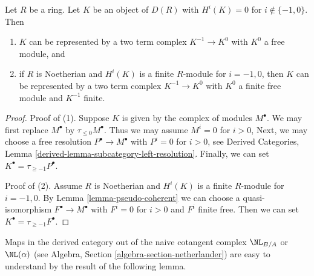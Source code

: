 \begin{lemma}
\label{lemma-represent-two-term-complex}
Let $R$ be a ring. Let $K$ be an object of $D(R)$ with $H^i(K) = 0$
for $i \not \in \{-1, 0\}$. Then
\begin{enumerate}
\item $K$ can be represented by a two term complex
$K^{-1} \to K^0$ with $K^0$ a free module, and
\item if $R$ is Noetherian and $H^i(K)$ is a finite $R$-module for
$i = -1, 0$, then $K$ can be represented by a two term complex
$K^{-1} \to K^0$ with $K^0$ a finite free module and $K^{-1}$ finite.
\end{enumerate}
\end{lemma}

\begin{proof}
Proof of (1). Suppose $K$ is given by the complex of modules $M^\bullet$.
We may first replace $M^\bullet$ by $\tau_{\leq 0}M^\bullet$. Thus we
may assume $M^i = 0$ for $i > 0$, Next, we may choose a
free resolution $P^\bullet \to M^\bullet$ with $P^i = 0$ for $i > 0$, see
Derived Categories, Lemma \ref{derived-lemma-subcategory-left-resolution}.
Finally, we can set $K^\bullet = \tau_{\geq -1}P^\bullet$.

\medskip\noindent
Proof of (2). Assume $R$ is Noetherian and $H^i(K)$ is a finite $R$-module for
$i = -1, 0$. By Lemma \ref{lemma-pseudo-coherent} we can choose a
quasi-isomorphism $F^\bullet \to M^\bullet$ with $F^i = 0$ for $i > 0$
and $F^i$ finite free. Then we can set $K^\bullet = \tau_{\geq -1}F^\bullet$.
\end{proof}

\noindent
Maps in the derived category out of the naive cotangent complex
$\NL_{B/A}$ or $\NL(\alpha)$ (see
Algebra, Section \ref{algebra-section-netherlander})
are easy to understand by the result of the following lemma.

